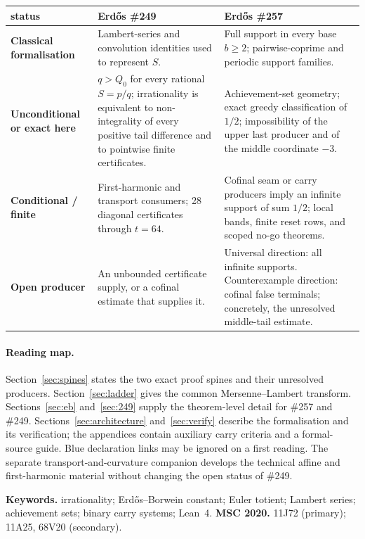 \documentclass[11pt]{article}
\theoremstyle{definition}
\theoremstyle{remark}
\newcommand{\Qzero}{Q_0}
\begin{document}
\begin{center}
\scriptsize
\begin{tabular}{@{}p{2.3cm}p{5.65cm}p{5.65cm}@{}}
\toprule
status & Erd\H{o}s \#249 & Erd\H{o}s \#257\\
\midrule
\textbf{Classical formalisation} &
Lambert-series and convolution identities used to represent $S$. &
Full support in every base $b\ge2$; pairwise-coprime and periodic support
families.\\[2pt]
\textbf{Unconditional or exact here} &
$q>\Qzero$ for every rational $S=p/q$; irrationality is equivalent to
non-integrality of every positive tail difference and to pointwise finite
certificates. &
Achievement-set geometry; exact greedy classification of $1/2$; impossibility
of the upper last producer and of the middle coordinate $-3$.\\[2pt]
\textbf{Conditional / finite} &
First-harmonic and transport consumers; 28 diagonal certificates through
$t=64$. &
Cofinal seam or carry producers imply an infinite support of sum $1/2$;
local bands, finite reset rows, and scoped no-go theorems.\\[2pt]
\textbf{Open producer} &
An unbounded certificate supply, or a cofinal estimate that supplies it. &
Universal direction: all infinite supports.  Counterexample direction:
cofinal false terminals; concretely, the unresolved middle-tail estimate.\\
\bottomrule
\end{tabular}
\end{center}

\paragraph{Reading map.}
Section~\ref{sec:spines} states the two exact proof spines and their unresolved
producers.  Section~\ref{sec:ladder} gives the common Mersenne--Lambert
transform.  Sections~\ref{sec:eb} and~\ref{sec:249} supply the theorem-level
detail for \#257 and \#249.
Sections~\ref{sec:architecture} and~\ref{sec:verify} describe the formalisation
and its verification; the appendices contain auxiliary carry criteria and a
formal-source guide.  Blue declaration links may be ignored on a
first reading.  The separate transport-and-curvature companion develops the
technical affine and first-harmonic material without changing the open status
of \#249.

\medskip
\noindent\textbf{Keywords.} irrationality; Erd\H{o}s--Borwein constant;
Euler totient; Lambert series; achievement sets; binary carry systems; Lean~4.
\qquad
\textbf{MSC 2020.} 11J72 (primary); 11A25, 68V20 (secondary).
\end{document}
